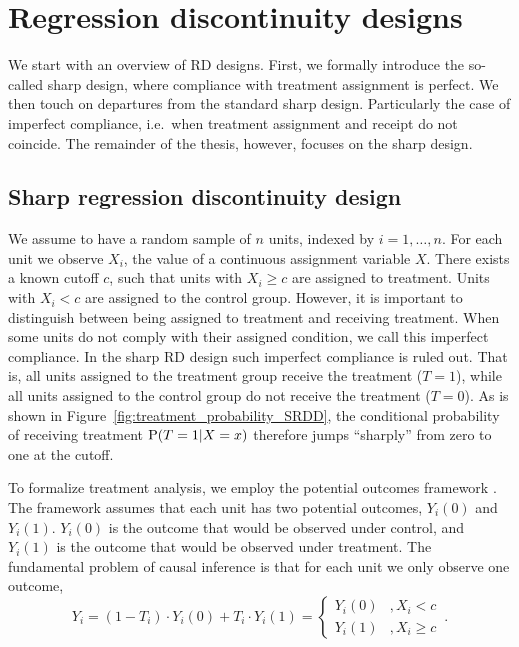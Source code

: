 


\section{Regression discontinuity designs}

We start with an overview of RD designs.
First, we formally introduce the so-called sharp design, where compliance with treatment assignment is perfect.
We then touch on departures from the standard sharp design.
Particularly the case of imperfect compliance, i.e.\ when treatment assignment and receipt do not coincide.
The remainder of the thesis, however, focuses on the sharp design.

\subsection{Sharp regression discontinuity design}

We assume to have a random sample of $n$ units, indexed by $i = 1, \dots, n$.
For each unit we observe $X_i$, the value of a continuous assignment variable $X$.
There exists a known cutoff $c$, such that units with $X_i \geq c$ are assigned to treatment.
Units with $X_i < c$ are assigned to the control group.
However, it is important to distinguish between being assigned to treatment and receiving treatment.
When some units do not comply with their assigned condition, we call this imperfect compliance.
In the sharp RD design such imperfect compliance is ruled out.
That is, all units assigned to the treatment group receive the treatment ($T = 1$), while all units assigned to the control group do not receive the treatment ($T = 0$).
As is shown in Figure~\ref{fig:treatment_probability_SRDD}, the conditional probability of receiving treatment $\operatorname{P}(T = 1 | X=x)$ therefore jumps \enquote{sharply} from zero to one at the cutoff.

To formalize treatment analysis, we employ the potential outcomes framework \parencite{Rubin_2005}.
The framework assumes that each unit has two potential outcomes, $Y_i(0)$ and $Y_i(1)$.
$Y_i(0)$ is the outcome that would be observed under control, and $Y_i(1)$ is the outcome that would be observed under treatment.
The fundamental problem of causal inference is that for each unit we only observe one outcome,
\begin{equation}
	Y_i = (1-T_i) \cdot Y_i(0) + T_i \cdot Y_i(1) = \begin{cases} 
		Y_i(0) & , X_i < c \\
		Y_i(1) & , X_i \geq c
	\end{cases} \,.
\end{equation}

